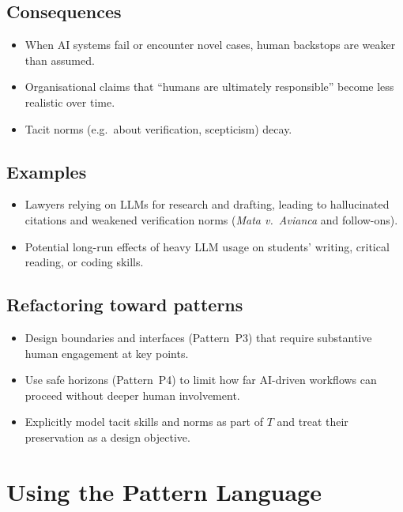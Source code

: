 \subsection*{Consequences}

\begin{itemize}
  \item When AI systems fail or encounter novel cases, human backstops
        are weaker than assumed.
  \item Organisational claims that ``humans are ultimately
        responsible'' become less realistic over time.
  \item Tacit norms (e.g.\ about verification, scepticism) decay.
\end{itemize}

\subsection*{Examples}

\begin{itemize}
  \item Lawyers relying on LLMs for research and drafting, leading to
        hallucinated citations and weakened verification norms
        (\emph{Mata v.\ Avianca} and follow-ons).
  \item Potential long-run effects of heavy LLM usage on students'
        writing, critical reading, or coding skills.
\end{itemize}

\subsection*{Refactoring toward patterns}

\begin{itemize}
  \item Design boundaries and interfaces (Pattern~P3) that require
        substantive human engagement at key points.
  \item Use safe horizons (Pattern~P4) to limit how far AI-driven
        workflows can proceed without deeper human involvement.
  \item Explicitly model tacit skills and norms as part of \(T\) and
        treat their preservation as a design objective.
\end{itemize}

\section{Using the Pattern Language}

